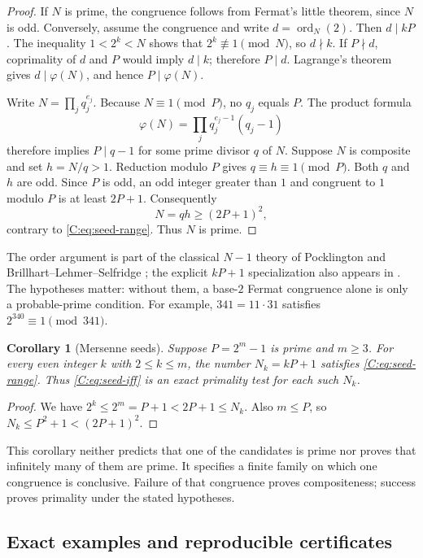 \documentclass[11pt,a4paper]{article}
\newtheorem{corollary}[theorem]{Corollary}
\theoremstyle{definition}
\theoremstyle{remark}
\numberwithin{equation}{section}
\begin{document}
\begin{proof}
If $N$ is prime, the congruence follows from Fermat's little theorem,
since $N$ is odd. Conversely, assume the congruence and write
$d=\operatorname{ord}_N(2)$. Then $d\mid kP$. The inequality
$1<2^k<N$ shows that $2^k\not\equiv1\pmod N$, so $d\nmid k$.
If $P\nmid d$, coprimality of $d$ and $P$ would imply $d\mid k$;
therefore $P\mid d$. Lagrange's theorem gives $d\mid\varphi(N)$,
and hence $P\mid\varphi(N)$.

Write $N=\prod_j q_j^{e_j}$. Because $N\equiv1\pmod P$, no $q_j$
equals $P$. The product formula
\[
 \varphi(N)=\prod_j q_j^{e_j-1}(q_j-1)
\]
therefore implies $P\mid q-1$ for some prime divisor $q$ of $N$.
Suppose $N$ is composite and set $h=N/q>1$. Reduction modulo $P$
gives $q\equiv h\equiv1\pmod P$. Both $q$ and $h$ are odd.
Since $P$ is odd, an odd integer greater than $1$ and congruent to
$1$ modulo $P$ is at least $2P+1$. Consequently
\[
  N=qh\ge(2P+1)^2,
\]
contrary to \eqref{C:eq:seed-range}. Thus $N$ is prime.
\end{proof}

The order argument is part of the classical $N-1$ theory of
Pocklington and Brillhart--Lehmer--Selfridge
\cite{R076,R077}; the explicit $kP+1$ specialization
also appears in \cite[Theorem~2.1]{R078}.
The hypotheses matter: without them, a base-$2$ Fermat congruence
alone is only a probable-prime condition. For example,
$341=11\cdot31$ satisfies $2^{340}\equiv1\pmod{341}$.

\begin{corollary}[Mersenne seeds]
\label{C:cor:mersenne-seed-range}
Suppose $P=2^m-1$ is prime and $m\ge3$. For every even integer
$k$ with $2\le k\le m$, the number $N_k=kP+1$ satisfies
\eqref{C:eq:seed-range}. Thus \eqref{C:eq:seed-iff} is an exact
primality test for each such $N_k$.
\end{corollary}

\begin{proof}
We have $2^k\le2^m=P+1<2P+1\le N_k$.
Also $m\le P$, so
$N_k\le P^2+1<(2P+1)^2$.
\end{proof}

This corollary neither predicts that one of the candidates is prime
nor proves that infinitely many of them are prime. It specifies a
finite family on which one congruence is conclusive. Failure of that
congruence proves compositeness; success proves primality under the
stated hypotheses.

\subsection{Exact examples and reproducible certificates}
\end{document}
